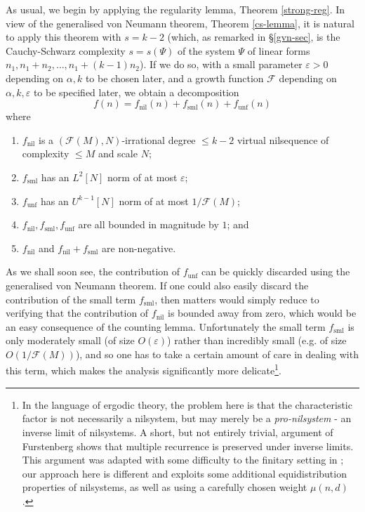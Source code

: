 \documentclass[11pt,reqno]{amsart}
\numberwithin{equation}{section}
\theoremstyle{plain}
\theoremstyle{definition}
\renewcommand{\leq}{\leqslant}
\newcommand\1{{\bf 1}}
\newcommand\2{{\bf 2}}
\newcommand\eps{\varepsilon}
\newcommand\nil{{\operatorname{nil}}}
\newcommand\sml{{\operatorname{sml}}}
\newcommand\unf{{\operatorname{unf}}}
\newcommand\Grow{{\mathcal F}}
\begin{document}
As usual, we begin by applying the regularity lemma, Theorem \ref{strong-reg}.  In view of the generalised von Neumann theorem, Theorem \ref{cs-lemma}, it is natural to apply this theorem with $s=k-2$ (which, as remarked in \S \ref{gvn-sec}, is the Cauchy-Schwarz complexity $s = s(\Psi)$ of the system $\Psi$ of  linear forms $n_1,n_1+n_2,\ldots,n_1+(k-1)n_2$).  If we do so, with a small parameter $\eps > 0$ depending on $\alpha,k$ to be chosen later, and a growth function $\Grow$ depending on $\alpha,k,\eps$ to be specified later, we obtain a decomposition
\begin{equation}\label{f-expand}
f(n) = f_{\nil}(n) + f_{\sml}(n) + f_{\unf}(n)
\end{equation}
where
\begin{enumerate}
\item $f_\nil$ is a $(\Grow(M),N)$-irrational degree $\leq k-2$ virtual nilsequence of complexity $\leq M$ and scale $N$;
\item $f_\sml$ has an $L^2[N]$ norm of at most $\eps$;
\item $f_\unf$ has an $U^{k-1}[N]$ norm of at most $1/\Grow(M)$;
\item $f_\nil, f_\sml, f_\unf$ are all bounded in magnitude by $1$; and
\item $f_\nil$ and $f_\nil+f_\sml$ are non-negative.
\end{enumerate}

As we shall soon see, the contribution of $f_\unf$ can be quickly discarded using the generalised von Neumann theorem.  If one could also easily discard the contribution of the small term $f_\sml$, then matters would simply reduce to verifying that the contribution of $f_\nil$ is bounded away from zero, which would be an easy consequence of the counting lemma.  Unfortunately the small term $f_\sml$ is only moderately small (of size $O(\eps)$) rather than incredibly small (e.g. of size $O(1/\Grow(M))$), and so one has to take a certain amount of care in dealing with this term, which makes the analysis significantly more delicate\footnote{In the language of ergodic theory, the problem here is that the characteristic factor is not necessarily a nilsystem, but may merely be a \emph{pro-nilsystem} - an inverse limit of nilsystems.  A short, but not entirely trivial, argument of Furstenberg \cite{furst} shows that multiple recurrence is preserved under inverse limits.  This argument was adapted with some difficulty to the finitary setting in \cite{tao-quant-ergodic}; our approach here is different and exploits some additional equidistribution properties of nilsystems, as well as using a carefully chosen weight $\mu(n,d)$.}.
\end{document}
